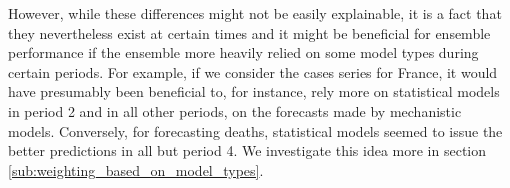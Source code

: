 However, while these differences might not be easily explainable, it is a fact that they nevertheless exist at certain times and it might be beneficial for ensemble performance if the ensemble more heavily relied on some model types during certain periods. For example, if we consider the cases series for France, it would have presumably been beneficial to, for instance, rely more on statistical models in period 2 and in all other periods, on the forecasts made by mechanistic models. Conversely, for forecasting deaths, statistical models seemed to issue the better predictions in all but period 4. We investigate this idea more in section \ref{sub:weighting_based_on_model_types}.
